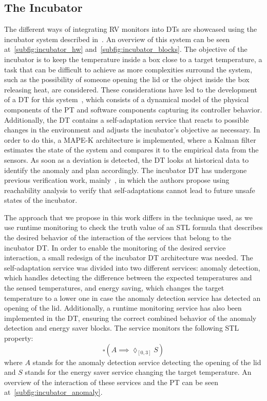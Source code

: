 \subsection{The Incubator}
The different ways of integrating RV monitors into DTs are showcased using the incubator system described in~\cite{Feng&21c}. An overview of this system can be seen at~\cref{subfig:incubator_hw} and~\cref{subfig:incubator_blocks}.
The objective of the incubator is to keep the temperature inside a box close to a target temperature, a task that can be difficult to achieve as more complexities surround the system, such as the possibility of someone opening the lid or the object inside the box releasing heat, are considered.
These considerations have led to the development of a DT for this system~\cite{Feng2022}, which consists of a dynamical model of the physical components of the PT and software components capturing its controller behavior. Additionally, the DT contains a self-adaptation service that reacts to possible changes in the environment and adjusts the incubator's objective as necessary. In order to do this, a MAPE-K architecture is implemented, where a Kalman filter estimates the state of the system and compares it to the empirical data from the sensors. As soon as a deviation is detected, the DT looks at historical data to identify the anomaly and plan accordingly.
The incubator DT has undergone previous verification work, mainly~\cite{Wright2022}, in which the authors propose using reachability analysis to verify that self-adaptations cannot lead to future unsafe states of the incubator.

The approach that we propose in this work differs in the technique used, as we use runtime monitoring to check the truth value of an STL formula that describes the desired behavior of the interaction of the services that belong to the incubator DT.
In order to enable the monitoring of the desired service interaction, a small redesign of the incubator DT architecture was needed.
The self-adaptation service was divided into two different services: anomaly detection, which handles detecting the difference between the expected temperatures and the sensed temperatures, and energy saving, which changes the target temperature to a lower one in case the anomaly detection service has detected an opening of the lid.
Additionally, a runtime monitoring service has also been implemented in the DT, ensuring the correct combined behavior of the anomaly detection and energy saver blocks.
The service monitors the following STL property:
\begin{equation}
	\square(A\implies \lozenge_{[0,3]} S)
\end{equation}
where $A$ stands for the anomaly detection service detecting the opening of the lid and $S$ stands for the energy saver service changing the target temperature. An overview of the interaction of these services and the PT can be seen at~\cref{subfig:incubator_anomaly}.

